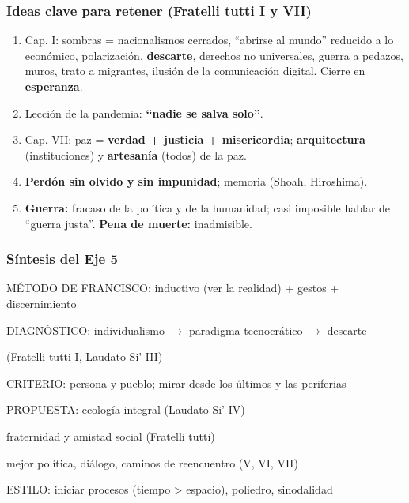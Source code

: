 \documentclass[10pt,a4paper]{article}
\newenvironment{esquema}{\par\medskip\begingroup\small\ttfamily\color{sub}}{\endgroup\medskip}
\begin{document}
\subsubsection{Ideas clave para retener (Fratelli tutti I y VII)}
\begin{enumerate}
\item Cap. I: sombras = nacionalismos cerrados, ``abrirse al mundo'' reducido a lo económico, polarización, \textbf{descarte}, derechos no universales, guerra a pedazos, muros, trato a migrantes, ilusión de la comunicación digital. Cierre en \textbf{esperanza}.
\item Lección de la pandemia: \textbf{``nadie se salva solo''}.
\item Cap. VII: paz = \textbf{verdad + justicia + misericordia}; \textbf{arquitectura} (instituciones) y \textbf{artesanía} (todos) de la paz.
\item \textbf{Perdón sin olvido y sin impunidad}; memoria (Shoah, Hiroshima).
\item \textbf{Guerra:} fracaso de la política y de la humanidad; casi imposible hablar de ``guerra justa''. \textbf{Pena de muerte:} inadmisible.
\end{enumerate}

\subsubsection{Síntesis del Eje 5}
\begin{esquema}
\noindent\hspace*{0.0em}MÉTODO DE FRANCISCO: inductivo (ver la realidad) + gestos + discernimiento\par
\noindent\hspace*{1.7em}DIAGNÓSTICO: individualismo $\rightarrow$ paradigma tecnocrático $\rightarrow$ descarte\par
\noindent\hspace*{8.8em}(Fratelli tutti I, Laudato Si' III)\par
\noindent\hspace*{1.7em}CRITERIO:    persona y pueblo; mirar desde los últimos y las periferias\par
\noindent\hspace*{1.7em}PROPUESTA:   ecología integral (Laudato Si' IV)\par
\noindent\hspace*{8.8em}fraternidad y amistad social (Fratelli tutti)\par
\noindent\hspace*{8.8em}mejor política, diálogo, caminos de reencuentro (V, VI, VII)\par
\noindent\hspace*{1.7em}ESTILO:      iniciar procesos (tiempo \textgreater{} espacio), poliedro, sinodalidad\par
\end{esquema}
\end{document}
